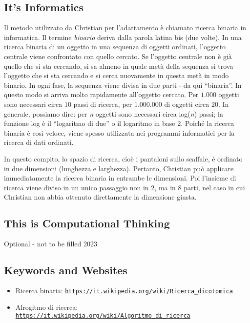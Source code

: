 \documentclass[a4paper,11pt]{report}
\newcommand{\BrochureUrlText}[1]{\texttt{#1}}
\begin{document}
\subsection*{It’s Informatics}

Il metodo utilizzato da Christian per l’adattamento è chiamato ricerca binaria in informatica. Il termine \emph{binario} deriva dalla parola latina bis (due volte). In una ricerca binaria di un oggetto in una sequenza di oggetti ordinati, l’oggetto centrale viene confrontato con quello cercato. Se l’oggetto centrale non è già quello che si sta cercando, si sa almeno in quale metà della sequenza si trova l’oggetto che si sta cercando e si cerca nuovamente in questa metà in modo binario. In ogni fase, la sequenza viene divisa in due parti - da qui \enquote{binaria}. In questo modo si arriva molto rapidamente all’oggetto cercato. Per $1.000$ oggetti sono necessari circa $10$ passi di ricerca, per $1.000$.$000$ di oggetti circa $20$. In generale, possiamo dire: per \emph{n} oggetti sono necessari circa log(\emph{n}) passi; la funzione log è il \enquote{logaritmo di due} o il logaritmo in base $2$. Poiché la ricerca binaria è così veloce, viene spesso utilizzata nei programmi informatici per la ricerca di dati ordinati.

In questo compito, lo spazio di ricerca, cioè i pantaloni sullo scaffale, è ordinato in due dimensioni (lunghezza e larghezza). Pertanto, Christian può applicare immediatamente la ricerca binaria in entrambe le dimensioni. Poi l’insieme di ricerca viene diviso in un unico passaggio non in $2$, ma in $8$ parti, nel caso in cui Christian non abbia ottenuto direttamente la dimensione giusta.


\subsection*{This is Computational Thinking}

Optional - not to be filled 2023

{\raggedright

\subsection*{Keywords and Websites}

\begin{itemize}
  \item Ricerca binaria: \href{https://it.wikipedia.org/wiki/Ricerca_dicotomica}{\BrochureUrlText{https://it.wikipedia.org/wiki/Ricerca\_dicotomica}}
  \item Alrogitmo di ricerca: \href{https://it.wikipedia.org/wiki/Algoritmo_di_ricerca}{\BrochureUrlText{https://it.wikipedia.org/wiki/Algoritmo\_di\_ricerca}}
\end{itemize}


}
\end{document}
